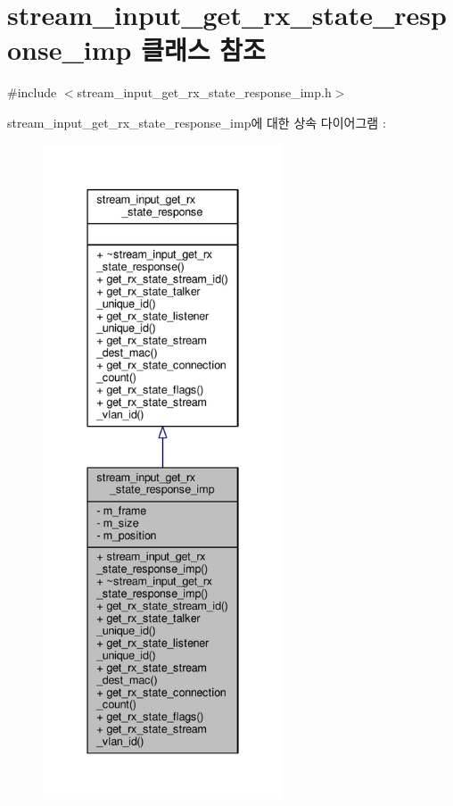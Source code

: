 \hypertarget{classavdecc__lib_1_1stream__input__get__rx__state__response__imp}{}\section{stream\+\_\+input\+\_\+get\+\_\+rx\+\_\+state\+\_\+response\+\_\+imp 클래스 참조}
\label{classavdecc__lib_1_1stream__input__get__rx__state__response__imp}


{\ttfamily \#include $<$stream\+\_\+input\+\_\+get\+\_\+rx\+\_\+state\+\_\+response\+\_\+imp.\+h$>$}



stream\+\_\+input\+\_\+get\+\_\+rx\+\_\+state\+\_\+response\+\_\+imp에 대한 상속 다이어그램 \+: 
\nopagebreak
\begin{figure}[H]
\begin{center}
\leavevmode
\includegraphics[height=550pt]{classavdecc__lib_1_1stream__input__get__rx__state__response__imp__inherit__graph}
\end{center}
\end{figure}


